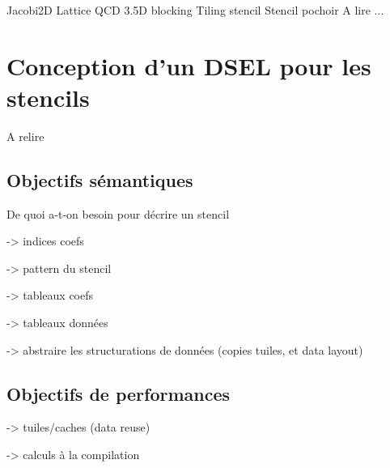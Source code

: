 Jacobi2D
Lattice QCD \cite{Art1}
3.5D blocking \cite{Art11}
Tiling stencil \cite{Art16}
Stencil pochoir \cite{Art18}
A lire ... \cite{Art19}

\section{Conception d'un DSEL pour les stencils}

A relire \cite{Art22}

\subsection{Objectifs sémantiques}

De quoi a-t-on besoin pour décrire un stencil

-> indices coefs

-> pattern du stencil

-> tableaux coefs

-> tableaux données

-> abstraire les structurations de données (copies tuiles, et data layout)

\subsection{Objectifs de performances}

-> tuiles/caches (data reuse)

-> calculs à la compilation

